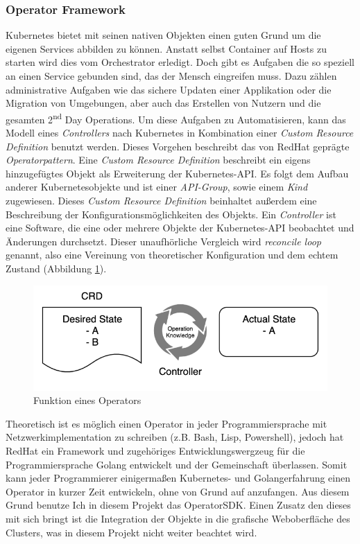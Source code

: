 \documentclass[a4paper,11pt]{article}
\begin{document}
      \subsubsection{Operator Framework}
      Kubernetes bietet mit seinen nativen Objekten einen guten Grund um die eigenen Services 
      abbilden zu können. Anstatt selbst Container auf Hosts zu starten wird dies vom Orchestrator erledigt.
      Doch gibt es Aufgaben die so speziell an einen Service gebunden sind, das der Mensch eingreifen muss.
      Dazu zählen administrative Aufgaben wie das sichere Updaten einer Applikation oder die Migration von Umgebungen,
      aber auch das Erstellen von Nutzern und die gesamten 2\textsuperscript{nd} Day Operations.
      Um diese Aufgaben zu Automatisieren, kann das Modell eines \emph{Controllers} nach Kubernetes in Kombination einer 
      \emph{Custom Resource Definition} benutzt werden. Dieses Vorgehen beschreibt das von 
      RedHat geprägte \emph{Operatorpattern}. Eine \emph{Custom Resource Definition} beschreibt ein eigens hinzugefügtes
      Objekt als Erweiterung der Kubernetes-API. Es folgt dem Aufbau anderer Kubernetesobjekte und ist einer \emph{API-Group}, sowie einem \emph{Kind} zugewiesen.
      Dieses \emph{Custom Resource Definition} beinhaltet außerdem eine Beschreibung der Konfigurationsmöglichkeiten des Objekts.
      Ein \emph{Controller} ist eine Software, die eine oder mehrere Objekte der Kubernetes-API beobachtet und Änderungen durchsetzt.
      Dieser unaufhörliche Vergleich wird \emph{reconcile loop} genannt, also eine Vereinung von theoretischer Konfiguration und dem echtem Zustand (Abbildung \ref{fig:reconcile_loop}). 
      \begin{figure}[!ht]
        \includegraphics[width=\linewidth]{assets/operator_loop.png}
        \caption{Funktion eines Operators}
        \label{fig:reconcile_loop}
      \end{figure}
      Theoretisch ist es möglich einen Operator in jeder Programmiersprache mit Netzwerkimplementation zu schreiben (z.B. Bash, Lisp, Powershell), jedoch
      hat RedHat ein Framework und zugehöriges Entwicklungswergzeug für die Programmiersprache Golang entwickelt und der Gemeinschaft überlassen.
      Somit kann jeder Programmierer einigermaßen Kubernetes- und Golangerfahrung einen Operator in kurzer Zeit entwickeln, ohne von Grund auf anzufangen.
      Aus diesem Grund benutze Ich in diesem Projekt das OperatorSDK. Einen Zusatz den dieses mit sich bringt ist die Integration der Objekte in die 
      grafische Weboberfläche des Clusters, was in diesem Projekt nicht weiter beachtet wird.
\end{document}
